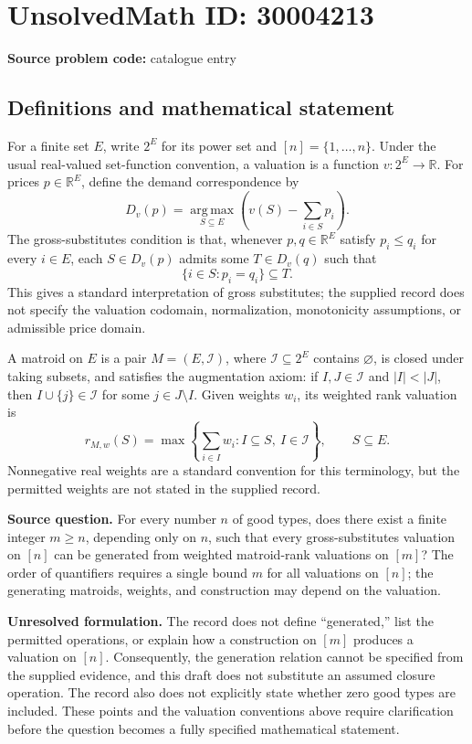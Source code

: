 \documentclass[11pt]{article}
\newcommand{\R}{\mathbb{R}}
\begin{document}
\section*{UnsolvedMath ID: 30004213}
\textbf{Source problem code:} catalogue entry
\subsection{Definitions and mathematical statement}
For a finite set \(E\), write \(2^E\) for its power set and \([n]=\{1,\ldots,n\}\). Under the usual real-valued set-function convention, a valuation is a function \(v:2^E\to\R\). For prices \(p\in\R^E\), define the demand correspondence by
\[
D_v(p)=\operatorname*{arg\,max}_{S\subseteq E}\left(v(S)-\sum_{i\in S}p_i\right).
\]
The gross-substitutes condition is that, whenever \(p,q\in\R^E\) satisfy \(p_i\le q_i\) for every \(i\in E\), each \(S\in D_v(p)\) admits some \(T\in D_v(q)\) such that
\[
\{i\in S:p_i=q_i\}\subseteq T.
\]
This gives a standard interpretation of gross substitutes; the supplied record does not specify the valuation codomain, normalization, monotonicity assumptions, or admissible price domain.

A matroid on \(E\) is a pair \(M=(E,\mathcal I)\), where \(\mathcal I\subseteq2^E\) contains \(\varnothing\), is closed under taking subsets, and satisfies the augmentation axiom: if \(I,J\in\mathcal I\) and \(|I|<|J|\), then \(I\cup\{j\}\in\mathcal I\) for some \(j\in J\setminus I\). Given weights \(w_i\), its weighted rank valuation is
\[
r_{M,w}(S)=\max\left\{\sum_{i\in I}w_i:I\subseteq S,\ I\in\mathcal I\right\},\qquad S\subseteq E.
\]
Nonnegative real weights are a standard convention for this terminology, but the permitted weights are not stated in the supplied record.

\textbf{Source question.} For every number \(n\) of good types, does there exist a finite integer \(m\ge n\), depending only on \(n\), such that every gross-substitutes valuation on \([n]\) can be generated from weighted matroid-rank valuations on \([m]\)? The order of quantifiers requires a single bound \(m\) for all valuations on \([n]\); the generating matroids, weights, and construction may depend on the valuation.

\textbf{Unresolved formulation.} The record does not define ``generated,'' list the permitted operations, or explain how a construction on \([m]\) produces a valuation on \([n]\). Consequently, the generation relation cannot be specified from the supplied evidence, and this draft does not substitute an assumed closure operation. The record also does not explicitly state whether zero good types are included. These points and the valuation conventions above require clarification before the question becomes a fully specified mathematical statement.
\end{document}
